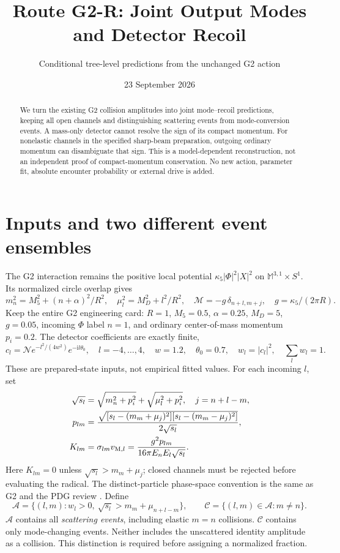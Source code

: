 \documentclass[11pt,a4paper]{article}
\title{Route G2-R: Joint Output Modes and Detector Recoil}
\author{Conditional tree-level predictions from the unchanged G2 action}
\date{23 September 2026}
\newcommand{\cA}{\mathcal A}
\newcommand{\cC}{\mathcal C}
\begin{document}
\maketitle
\begin{abstract}
We turn the existing G2 collision amplitudes into joint mode--recoil
predictions, keeping all open channels and distinguishing scattering
events from mode-conversion events. A mass-only detector cannot resolve
the sign of its compact momentum. For nonelastic channels in the
specified sharp-beam preparation, outgoing ordinary momentum can
disambiguate that sign. This is a model-dependent reconstruction, not
an independent proof of compact-momentum conservation. No new action,
parameter fit, absolute encounter probability or external drive is added.
\end{abstract}

\section{Inputs and two different event ensembles}
The G2 interaction remains the positive local potential
$\kappa_5|\Phi|^2|X|^2$ on $\mathbb M^{3,1}\times S^1$.
Its normalized circle overlap gives
\begin{equation}
 m_n^2=M_5^2+(n+\alpha)^2/R^2,\quad
 \mu_l^2=M_D^2+l^2/R^2,\quad
 \mathcal M=-g\,\delta_{n+l,m+j},\quad g=\kappa_5/(2\pi R).
\end{equation}
Keep the entire G2 engineering card:
$R=1$, $M_5=0.5$, $\alpha=0.25$, $M_D=5$, $g=0.05$,
incoming $\Phi$ label $n=1$, and ordinary center-of-mass momentum
$p_i=0.2$. The detector coefficients are exactly finite,
\begin{equation}
 c_l=\mathcal N e^{-l^2/(4w^2)}e^{-\mathrm i l\theta_0},
 \quad l=-4,\ldots,4,\quad w=1.2,\quad\theta_0=0.7,\quad
 w_l=|c_l|^2,\quad\sum_l w_l=1.
\end{equation}
These are prepared-state inputs, not empirical fitted values.
For each incoming $l$, set
\begin{align}
 \sqrt{s_l}&=\sqrt{m_n^2+p_i^2}+\sqrt{\mu_l^2+p_i^2},\quad
 j=n+l-m,\\
 p_{lm}&=\frac{\sqrt{[s_l-(m_m+\mu_j)^2]
                             [s_l-(m_m-\mu_j)^2]}}{2\sqrt{s_l}},\\
 K_{lm}&=\sigma_{lm}v_{{\rm M},l}
 =\frac{g^2p_{lm}}{16\pi E_nE_l\sqrt{s_l}}.
 \label{eq:rate}
\end{align}
Here $K_{lm}=0$ unless $\sqrt{s_l}>m_m+\mu_j$; closed channels
must be rejected before evaluating the radical. The distinct-particle
phase-space convention is the same as G2 and the PDG review
\cite{pdg}. Define
\begin{equation}
 \cA=\{(l,m):w_l>0,\ \sqrt{s_l}>m_m+\mu_{n+l-m}\},\qquad
 \cC=\{(l,m)\in\cA:m\ne n\}.
\end{equation}
$\cA$ contains all \emph{scattering events}, including elastic
$m=n$ collisions. $\cC$ contains only mode-changing events.
Neither includes the unscattered identity amplitude as a collision.
This distinction is required before assigning a normalized fraction.
\end{document}
